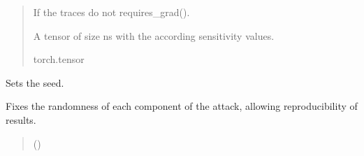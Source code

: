 \documentclass[letterpaper,10pt,english]{sphinxmanual}
\begin{document}
\begin{fulllineitems}
\begin{fulllineitems}
\begin{quote}
\begin{description}
\begin{itemize}
\end{itemize}

\sphinxAtStartPar
{} \textendash{} If the traces do not requires\_grad().

\sphinxAtStartPar
A tensor of size ns with the according sensitivity values.

\sphinxAtStartPar
torch.tensor

\end{description}\end{quote}

\end{fulllineitems}


\begin{fulllineitems}
\label{\detokenize{MLSCAlib.Attacks:MLSCAlib.Attacks.attack.Attack.set_pruning_percentage}}
\pysigstartsignatures
{}
\pysigstopsignatures
\end{fulllineitems}


\begin{fulllineitems}
\label{\detokenize{MLSCAlib.Attacks:MLSCAlib.Attacks.attack.Attack.set_seed}}
\pysigstartsignatures
{}
\pysigstopsignatures
\sphinxAtStartPar
Sets the seed.

\sphinxAtStartPar
Fixes the randomness of each component of the attack, allowing reproducibility of results.
\begin{quote}\begin{description}
\sphinxAtStartPar
{} () \textendash{} 

\end{description}\end{quote}

\end{fulllineitems}


\end{fulllineitems}
\end{document}
